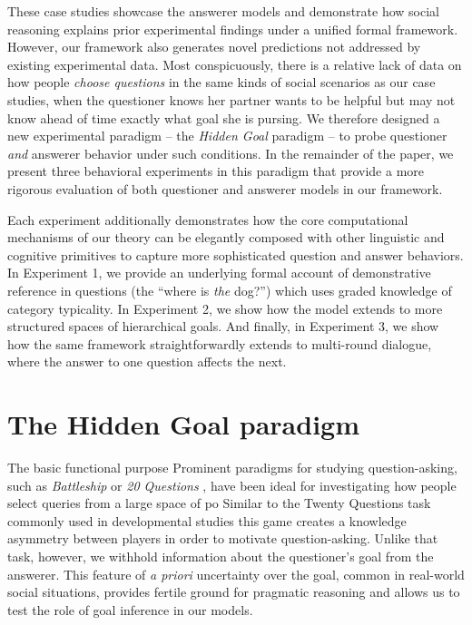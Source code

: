 \documentclass[12pt, floatsintext, jou]{apa6}
\begin{document}
These case studies showcase the answerer models and demonstrate how social reasoning explains prior experimental findings under a unified formal framework. 
However, our framework also generates novel predictions not addressed by existing experimental data.
Most conspicuously, there is a relative lack of data on how people \emph{choose questions} in the same kinds of social scenarios as our case studies, when the questioner knows her partner wants to be helpful but may not know ahead of time exactly what goal she is pursing.
We therefore designed a new experimental paradigm -- the \emph{Hidden Goal} paradigm -- to probe questioner \emph{and} answerer behavior under such conditions.
In the remainder of the paper, we present three behavioral experiments in this paradigm that provide a more rigorous evaluation of both questioner and answerer models in our framework.

Each experiment additionally demonstrates how the core computational mechanisms of our theory can be elegantly composed with other linguistic and cognitive primitives to capture more sophisticated question and answer behaviors.
In Experiment 1, we provide an underlying formal account of demonstrative reference in questions (the ``where is \emph{the} dog?'') which uses graded knowledge of category typicality.
In Experiment 2, we show how the model extends to more structured spaces of hierarchical goals.
And finally, in Experiment 3, we show how the same framework straightforwardly extends to multi-round dialogue, where the answer to one question affects the next.

\section{The Hidden Goal paradigm}

The basic functional purpose 
Prominent paradigms for studying question-asking, such as \emph{Battleship} \cite{RotheEtAl16_NaturalLanguageQuestions, rothe2018people} or \emph{20 Questions} \cite{Siegler77_TwentyQuestions, NelsonDivjak___Meder14_GuessWho, RuggeriEtAl15_HierarchicalTwentyQs}, have been ideal for investigating how people select queries from a large space of po
Similar to the Twenty Questions task commonly used in developmental studies this game creates a knowledge asymmetry between players in order to motivate question-asking. 
Unlike that task, however, we withhold information about the questioner's goal from the answerer. 
This feature of \emph{a priori} uncertainty over the goal, common in real-world social situations, provides fertile ground for pragmatic reasoning and allows us to test the role of goal inference in our models. 
\end{document}
